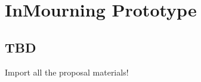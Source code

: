 \chapter{InMourning Prototype}

\section{TBD}
Import all the proposal materials!

\clearpage
\newpage
